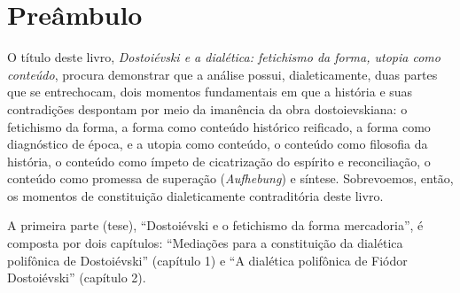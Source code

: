 














\chapter{Preâmbulo}

O título deste livro, \emph{Dostoiévski e a dialética: fetichismo da
forma, utopia como conteúdo}, procura demonstrar que a análise possui,
dialeticamente, duas partes que se entrechocam, dois momentos
fundamentais em que a história e suas contradições despontam por meio da
imanência da obra dostoievskiana: o fetichismo da forma, a forma como
conteúdo histórico reificado, a forma como diagnóstico de época, e a
utopia como conteúdo, o conteúdo como filosofia da história, o conteúdo
como ímpeto de cicatrização do espírito e reconciliação, o conteúdo como
promessa de superação (\emph{Aufhebung}) e síntese. Sobrevoemos, então,
os momentos de constituição dialeticamente contraditória deste livro.

A primeira parte (tese), ``Dostoiévski e o fetichismo da forma
mercadoria'', é composta por dois capítulos: ``Mediações para a
constituição da dialética polifônica de Dostoiévski'' (capítulo 1) e ``A
dialética polifônica de Fiódor Dostoiévski'' (capítulo 2).

